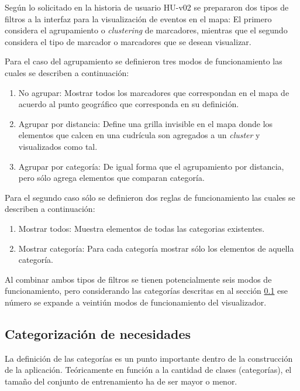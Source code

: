 Según lo solicitado en la historia de usuario HU-v02 se prepararon dos tipos de filtros a la interfaz para la visualización de eventos en el mapa: El primero considera el agrupamiento o \textit{clustering} de marcadores, mientras que el segundo considera el tipo de marcador o marcadores que se desean visualizar.

Para el caso del agrupamiento se definieron tres modos de funcionamiento las cuales se describen a continuación:

\begin{enumerate}
\item No agrupar: Mostrar todos los marcadores que correspondan en el mapa de acuerdo al punto geográfico que corresponda en su definición.
\item Agrupar por distancia: Define una grilla invisible en el mapa donde los elementos que calcen en una cudrícula son agregados a un \textit{cluster} y visualizados como tal.
\item Agrupar por categoría: De igual forma que el agrupamiento por distancia, pero sólo agrega elementos que comparan categoría.
\end{enumerate}

Para el segundo caso sólo se definieron dos reglas de funcionamiento las cuales se describen a continuación:

\begin{enumerate}
\item Mostrar todos: Muestra elementos de todas las categorias existentes.
\item Mostrar categoría: Para cada categoría mostrar sólo los elementos de aquella categoría. 
\end{enumerate}

Al combinar ambos tipos de filtros se tienen potencialmente seis modos de funcionamiento, pero considerando las categorías descritas en al sección \ref{sec:diseno:categorias} ese número se expande a veintiún modos de funcionamiento del visualizador.

\subsection{Categorización de necesidades}
\label{sec:diseno:categorias}

La definición de las categorías es un punto importante dentro de la construcción de la aplicación. Teóricamente en función a la cantidad de clases (categorías), el tamaño del conjunto de entrenamiento ha de ser mayor o menor.

